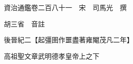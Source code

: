 










 


 
 


 

  
  
  
  
  





  
  
  
  
  
 
  

  

  
  
  



  

 
 

  
   




  

  
  


  　　資治通鑑卷二百八十一　宋　司馬光　撰

　　胡三省　音註

　　後晉紀二【起彊圉作噩盡著雍閹茂凡二年】

　　高祖聖文章武明德孝皇帝上之下

